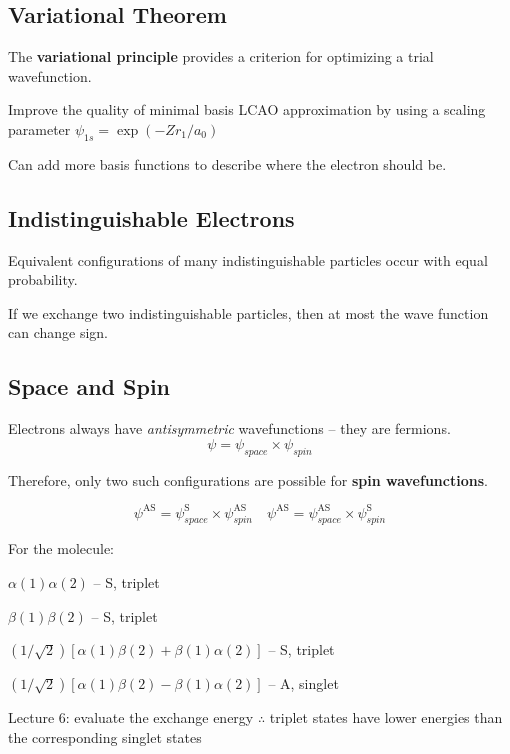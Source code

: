 \subsection*{Variational Theorem}
The \textbf{variational principle} provides a criterion for optimizing a trial wavefunction.

Improve the quality of minimal basis LCAO approximation by using a scaling parameter $\psi_{1s} = \exp (-Zr_1/a_0)$

Can add more basis functions to describe where the electron should be.

\subsection*{Indistinguishable Electrons}
Equivalent configurations of many indistinguishable particles occur with equal probability.

If we exchange two indistinguishable particles, then at most the
wave function can change sign. 

\subsection*{Space and Spin}
Electrons always have \textit{antisymmetric} wavefunctions -- they are fermions.
$$\psi = \psi_{space} \times \psi_{spin}$$

Therefore, only two such configurations are possible for \textbf{spin wavefunctions}.

$$ \psi^{\mathrm{AS}} = \psi_{space}^{\mathrm{S}} \times \psi_{spin}^{\mathrm{AS}} \quad \psi^{\mathrm{AS}} = \psi_{space}^{\mathrm{AS}} \times \psi_{spin}^{\mathrm{S}} $$

For the  molecule:

$\alpha(1)\alpha(2)$ -- S, triplet

$\beta(1)\beta(2)$ -- S, triplet

$(1/\sqrt{2})[\alpha(1)\beta(2)+\beta(1)\alpha(2)]$ -- S, triplet

$(1/\sqrt{2})[\alpha(1)\beta(2)-\beta(1)\alpha(2)]$ -- A, singlet

Lecture 6: evaluate the exchange energy $\therefore$ triplet states have lower energies than the corresponding singlet states